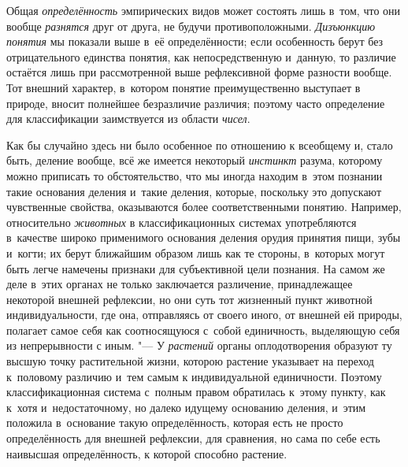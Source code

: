 Общая {\em определённость}
эмпирических видов может состоять лишь в~том, что они вообще
{\em разнятся} друг от
друга, не будучи противоположными.
{\em Дизъюнкцию понятия}
мы показали выше в~её определённости; если особенность берут
без отрицательного единства понятия, как непосредственную и~данную, то
различие остаётся лишь при рассмотренной выше рефлексивной форме разности
вообще. Тот внешний характер, в~котором понятие преимущественно выступает в
природе, вносит полнейшее безразличие различия; поэтому часто определение
для классификации заимствуется из области
{\em чисел}.

Как бы случайно здесь ни было особенное по отношению к
всеобщему и, стало быть, деление вообще, всё же имеется некоторый
{\em инстинкт} разума,
которому можно приписать то обстоятельство, что мы иногда находим в~этом
познании такие основания деления и~такие деления, которые, поскольку это
допускают чувственные свойства, оказываются более соответственными понятию.
Например, относительно {\em животных}
в классификационных системах употребляются в~качестве широко
применимого основания деления орудия принятия пищи, зубы и~когти; их берут
ближайшим образом лишь как те стороны, в~которых могут быть легче намечены
признаки для субъективной цели познания. На самом же деле в~этих органах не
только заключается различение, принадлежащее некоторой внешней рефлексии,
но они суть тот жизненный пункт животной индивидуальности, где она,
отправляясь от своего иного, от внешней ей природы, полагает самое себя
как соотносящуюся с~собой единичность, выделяющую себя из непрерывности с
иным. "--- У {\em растений} органы
оплодотворения образуют ту высшую точку растительной жизни, которою
растение указывает на переход к~половому различию и~тем самым к
индивидуальной единичности. Поэтому классификационная система с~полным
правом обратилась к~этому пункту, как к~хотя и~недостаточному, но далеко
идущему основанию деления, и~этим положила в~основание такую
определённость, которая есть не просто определённость для внешней
рефлексии, для сравнения, но сама по себе есть наивысшая определённость, к
которой способно растение.


